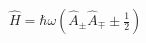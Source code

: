 \documentclass[preview]{standalone}
\begin{document}
\begin{center}
$\hat{H} = \hbar\omega\left(\hat{A}_{\pm}\hat{A}_{\mp} \pm \frac{1}{2}\right)$
\end{center}
\end{document}
